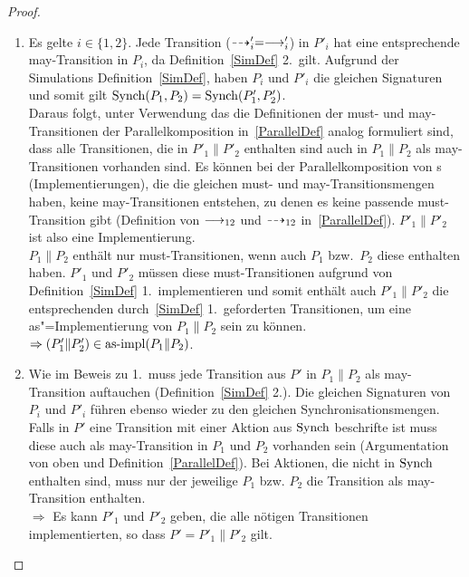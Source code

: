 \begin{proof}
  \begin{enumerate}
    \item Es gelte $i\in\{1,2\}$. Jede Transition ($\may '_i =\must '_i$) in
      $P'_i$ hat eine entsprechende may-Transition in $P_i$, da
      Definition~\ref{SimDef} 2.\ gilt. Aufgrund der Simulations
      Definition~\ref{SimDef}, haben $P_i$ und $P'_i$ die gleichen Signaturen
      und somit gilt $\mathrm{Synch} (P_1,P_2) =\mathrm{Synch} (P'_1,P'_2)$.\\
      Daraus folgt, unter Verwendung das die Definitionen der must- und
      may-Transitionen der Parallelkomposition in~\ref{ParallelDef} analog
      formuliert sind, dass alle Transitionen, die in $P'_1\|P'_2$ enthalten
      sind auch in $P_1\|P_2$ als may-Transitionen vorhanden sind. Es können
      bei der Parallelkomposition von \MEIO{}s (Implementierungen), die die
      gleichen must- und may-Transitionsmengen haben, keine may-Transitionen
      entstehen, zu denen es keine passende must-Transition gibt (Definition
      von $\must _{12}$ und $\may _{12}$ in~\ref{ParallelDef}). $P'_1\|P'_2$
      ist also eine Implementierung.\\
      $P_1\|P_2$ enthält nur must-Transitionen, wenn auch $P_1$ bzw.\ $P_2$
      diese enthalten haben. $P'_1$ und $P'_2$ müssen diese must-Transitionen
      aufgrund von Definition~\ref{SimDef} 1.\ implementieren und somit enthält auch
      $P'_1\|P'_2$ die entsprechenden durch~\ref{SimDef} 1.\ geforderten
      Transitionen, um eine as"=Implementierung von $P_1\|P_2$ sein zu können.\\
      $\Rightarrow (P'_1\|P'_2)\in\mathrm{as}\text{-}\mathrm{impl} (P_1\|P_2)$.
    \item Wie im Beweis zu 1.\ muss jede Transition aus $P'$ in $P_1\|P_2$ als
      may-Transition auftauchen (Definition~\ref{SimDef} 2.). Die gleichen
      Signaturen von $P_i$ und $P'_i$ führen ebenso wieder zu den gleichen
      Synchronisationsmengen.\\
      Falls in $P'$ eine Transition mit einer Aktion aus $\mathrm{Synch}$ beschrifte
      ist muss diese auch als may-Transition in $P_1$ und $P_2$ vorhanden sein
      (Argumentation von oben und Definition~\ref{ParallelDef}). Bei Aktionen,
      die nicht in $\mathrm{Synch}$ enthalten sind, muss nur der jeweilige \MEIO{}
      $P_1$ bzw. $P_2$ die Transition als may-Transition enthalten.\\
      $\Rightarrow$ Es kann $P'_1$ und $P'_2$ geben, die alle nötigen
      Transitionen implementierten, so dass $P'=P'_1\|P'_2$ gilt.\\

\end{enumerate}
\end{proof}
